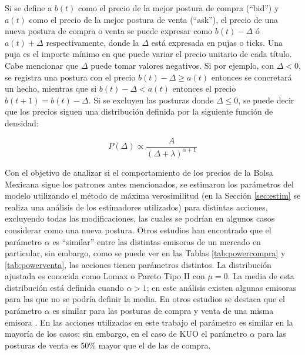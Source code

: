 \documentclass[11pt]{article}
\numberwithin{equation}{section} %
\begin{document}
Si se define a $b(t)$ como el precio de la mejor postura de compra (``bid'') y $a(t)$ como el precio de la mejor postura de venta (``ask''), el precio de una nueva postura de compra o venta se puede expresar como $b(t)-\Delta$ ó $a(t)+\Delta$ respectivamente, donde la $\Delta$ está expresada en pujas o ticks. Una puja es el importe mínimo en que puede variar el precio unitario de cada título. Cabe mencionar que $\Delta$ puede tomar valores negativos. Si por ejemplo, con $\Delta <0$, se registra una postura con el precio $b(t)-\Delta \geq a(t)$ entonces se concretará un hecho, mientras que si $b(t)-\Delta < a(t)$ entonces el precio $b(t+1)=b(t)-\Delta$. Si se excluyen las posturas donde $\Delta \leq 0$, se puede decir que los precios siguen una distribución definida por la siguiente función de densidad:

\begin{equation}
P\left(\Delta\right) \propto \frac{A}{{\left(\Delta+\lambda\right)}^{\alpha+1}}
\end{equation}

Con el objetivo de analizar si el comportamiento de los precios de la Bolsa Mexicana sigue los patrones antes mencionados, se estimaron los parámetros del modelo utilizando el método de máxima verosimilitud (en la Sección \ref{sec:estim} se realiza una análisis de los estimadores utilizados) para distintas acciones, excluyendo todas las modificaciones, las cuales se podrían en algunos casos considerar como una nueva postura. Otros estudios han encontrado que el parámetro $\alpha$ es ``similar'' entre las distintas emisoras \cite{zovko2002power} de un mercado en particular, sin embargo, como se puede ver en las Tablas \ref{tab:powercompra} y \ref{tab:powerventa}, las acciones tienen parámetros distintos. La distribución ajustada es conocida como Lomax o Pareto Tipo II con $\mu=0$. La media de esta distribución está definida cuando $\alpha>1$; en este análisis existen algunas emisoras para las que no se podría definir la media. En otros estudios se destaca que el parámetro $\alpha$ es similar para las posturas de compra y venta de una misma emisora \cite{Bouchaud2002}. En las acciones utilizadas en este trabajo el parámetro es similar en la mayoría de los casos; sin embargo, en el caso de KUO el parámetro $\alpha$ para las posturas de venta es 50\% mayor que el de las de compra.\\
\end{document}
